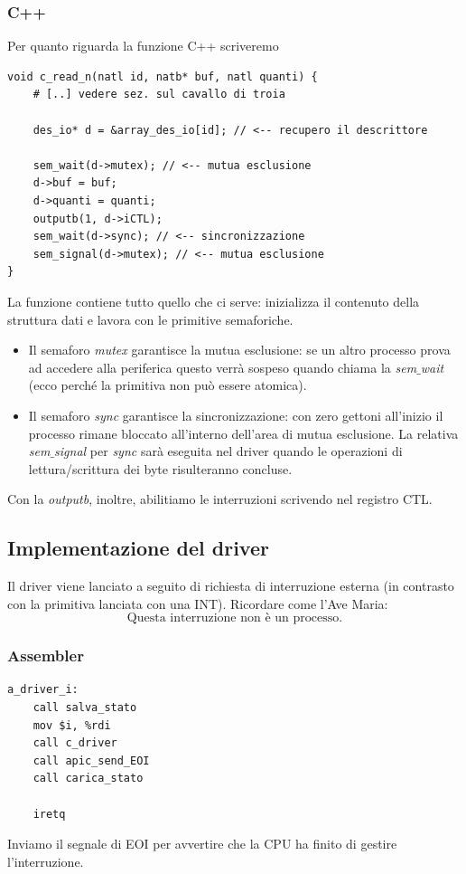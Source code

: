 \documentclass[11pt]{report}
\theoremstyle{definition}
\begin{document}
\subsubsection{C++} Per quanto riguarda la funzione C++ scriveremo
\begin{verbatim}
void c_read_n(natl id, natb* buf, natl quanti) {
    # [..] vedere sez. sul cavallo di troia
	
    des_io* d = &array_des_io[id]; // <-- recupero il descrittore
    
    sem_wait(d->mutex); // <-- mutua esclusione
    d->buf = buf;
    d->quanti = quanti;
    outputb(1, d->iCTL);
    sem_wait(d->sync); // <-- sincronizzazione
    sem_signal(d->mutex); // <-- mutua esclusione
}
\end{verbatim}
La funzione contiene tutto quello che ci serve: inizializza il contenuto della struttura dati e lavora con le primitive semaforiche.
\begin{itemize}
	\item Il semaforo \emph{mutex} garantisce la mutua esclusione: se un altro processo prova ad accedere alla periferica questo verrà sospeso quando chiama la \emph{sem$\_$wait} (ecco perché la primitiva non può essere atomica).
	\item Il semaforo \emph{sync} garantisce la sincronizzazione: con zero gettoni all'inizio il processo rimane bloccato all'interno dell'area di mutua esclusione. La relativa \emph{sem$\_$signal} per \emph{sync} sarà eseguita nel driver quando le operazioni di lettura/scrittura dei byte risulteranno concluse.
\end{itemize} 
Con la \emph{outputb}, inoltre, abilitiamo le interruzioni scrivendo nel registro CTL.
\subsection{Implementazione del driver}
Il driver viene lanciato a seguito di richiesta di interruzione esterna (in contrasto con la primitiva lanciata con una INT). Ricordare come l'Ave Maria:
\[\boxed{\text{Questa interruzione non è un processo.}}\]
\subsubsection{Assembler}
\begin{verbatim}
a_driver_i:
    call salva_stato
    mov $i, %rdi
    call c_driver
    call apic_send_EOI
    call carica_stato
    
    iretq
\end{verbatim}
Inviamo il segnale di EOI per avvertire che la CPU ha finito di gestire l'interruzione. 
\end{document}
